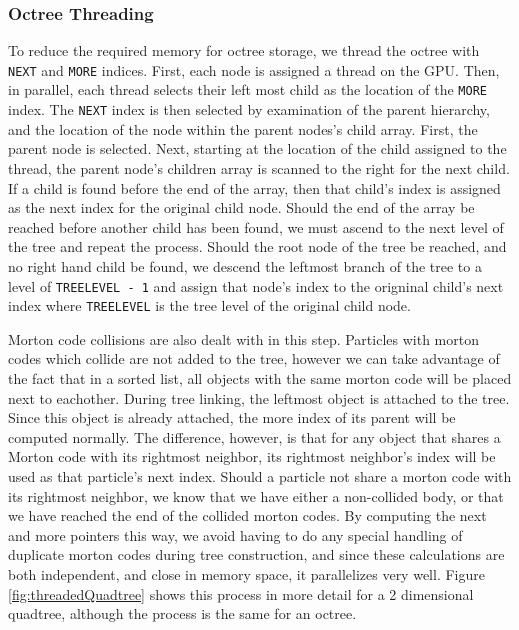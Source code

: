 \documentclass{thesis}
\begin{document}
\subsubsection{Octree Threading}
To reduce the required memory for octree storage, we thread the octree with \verb|NEXT| and \verb|MORE| indices. First, each node is assigned a thread on the GPU. Then, in parallel, each thread selects their left most child as the location of the \verb|MORE| index. The \verb|NEXT| index is then selected by examination of the parent hierarchy, and the location of the node within the parent nodes's child array. First, the parent node is selected. Next, starting at the location of the child assigned to the thread, the parent node's children array is scanned to the right for the next child. If a child is found before the end of the array, then that child's index is assigned as the next index for the original child node. Should the end of the array be reached before another child has been found, we must ascend to the next level of the tree and repeat the process. Should the root node of the tree be reached, and no right hand child be found, we descend the leftmost branch of the tree to a level of \verb|TREELEVEL - 1| and assign that node's index to the origninal child's next index where \verb|TREELEVEL| is the tree level of the original child node.

Morton code collisions are also dealt with in this step. Particles with morton codes which collide are not added to the tree, however we can take advantage of the fact that in a sorted list, all objects with the same morton code will be placed next to eachother. During tree linking, the leftmost object is attached to the tree. Since this object is already attached, the more index of its parent will be computed normally. The difference, however, is that for any object that shares a Morton code with its rightmost neighbor, its rightmost neighbor's index will be used as that particle's next index. Should a particle not share a morton code with its rightmost neighbor, we know that we have either a non-collided body, or that we have reached the end of the collided morton codes. By computing the next and more pointers this way, we avoid having to do any special handling of duplicate morton codes during tree construction, and since these calculations are both independent, and close in memory space, it parallelizes very well. Figure \ref{fig:threadedQuadtree} shows this process in more detail for a 2 dimensional quadtree, although the process is the same for an octree.
\end{document}
